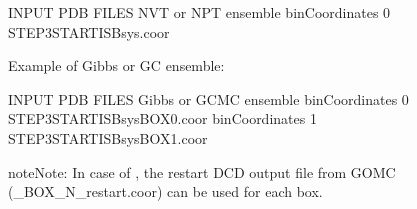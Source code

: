 \documentclass[letterpaper,10pt,english]{sphinxmanual}
\begin{document}
\begin{description}
\begin{sphinxVerbatim}[commandchars=\\\{\}]
\PYGZsh{}\PYGZsh{}\PYGZsh{}\PYGZsh{}\PYGZsh{}\PYGZsh{}\PYGZsh{}\PYGZsh{}\PYGZsh{}\PYGZsh{}\PYGZsh{}\PYGZsh{}\PYGZsh{}\PYGZsh{}\PYGZsh{}\PYGZsh{}\PYGZsh{}\PYGZsh{}\PYGZsh{}\PYGZsh{}\PYGZsh{}\PYGZsh{}\PYGZsh{}\PYGZsh{}\PYGZsh{}\PYGZsh{}\PYGZsh{}\PYGZsh{}\PYGZsh{}\PYGZsh{}\PYGZsh{}\PYGZsh{}\PYGZsh{}\PYGZsh{}\PYGZsh{}\PYGZsh{}\PYGZsh{}\PYGZsh{}\PYGZsh{}\PYGZsh{}\PYGZsh{}\PYGZsh{}\PYGZsh{}\PYGZsh{}\PYGZsh{}
\PYGZsh{} INPUT PDB FILES \PYGZhy{} NVT or NPT ensemble
\PYGZsh{}\PYGZsh{}\PYGZsh{}\PYGZsh{}\PYGZsh{}\PYGZsh{}\PYGZsh{}\PYGZsh{}\PYGZsh{}\PYGZsh{}\PYGZsh{}\PYGZsh{}\PYGZsh{}\PYGZsh{}\PYGZsh{}\PYGZsh{}\PYGZsh{}\PYGZsh{}\PYGZsh{}\PYGZsh{}\PYGZsh{}\PYGZsh{}\PYGZsh{}\PYGZsh{}\PYGZsh{}\PYGZsh{}\PYGZsh{}\PYGZsh{}\PYGZsh{}\PYGZsh{}\PYGZsh{}\PYGZsh{}\PYGZsh{}\PYGZsh{}\PYGZsh{}\PYGZsh{}\PYGZsh{}\PYGZsh{}\PYGZsh{}\PYGZsh{}\PYGZsh{}\PYGZsh{}\PYGZsh{}\PYGZsh{}\PYGZsh{}
binCoordinates   0   STEP3\PYGZus{}START\PYGZus{}ISB\PYGZus{}sys.coor
\end{sphinxVerbatim}

\sphinxAtStartPar
Example of Gibbs or GC ensemble:

\begin{sphinxVerbatim}[commandchars=\\\{\}]
\PYGZsh{}\PYGZsh{}\PYGZsh{}\PYGZsh{}\PYGZsh{}\PYGZsh{}\PYGZsh{}\PYGZsh{}\PYGZsh{}\PYGZsh{}\PYGZsh{}\PYGZsh{}\PYGZsh{}\PYGZsh{}\PYGZsh{}\PYGZsh{}\PYGZsh{}\PYGZsh{}\PYGZsh{}\PYGZsh{}\PYGZsh{}\PYGZsh{}\PYGZsh{}\PYGZsh{}\PYGZsh{}\PYGZsh{}\PYGZsh{}\PYGZsh{}\PYGZsh{}\PYGZsh{}\PYGZsh{}\PYGZsh{}\PYGZsh{}\PYGZsh{}\PYGZsh{}\PYGZsh{}\PYGZsh{}\PYGZsh{}\PYGZsh{}\PYGZsh{}\PYGZsh{}\PYGZsh{}\PYGZsh{}\PYGZsh{}\PYGZsh{}
\PYGZsh{} INPUT PDB FILES \PYGZhy{} Gibbs or GCMC ensemble
\PYGZsh{}\PYGZsh{}\PYGZsh{}\PYGZsh{}\PYGZsh{}\PYGZsh{}\PYGZsh{}\PYGZsh{}\PYGZsh{}\PYGZsh{}\PYGZsh{}\PYGZsh{}\PYGZsh{}\PYGZsh{}\PYGZsh{}\PYGZsh{}\PYGZsh{}\PYGZsh{}\PYGZsh{}\PYGZsh{}\PYGZsh{}\PYGZsh{}\PYGZsh{}\PYGZsh{}\PYGZsh{}\PYGZsh{}\PYGZsh{}\PYGZsh{}\PYGZsh{}\PYGZsh{}\PYGZsh{}\PYGZsh{}\PYGZsh{}\PYGZsh{}\PYGZsh{}\PYGZsh{}\PYGZsh{}\PYGZsh{}\PYGZsh{}\PYGZsh{}\PYGZsh{}\PYGZsh{}\PYGZsh{}\PYGZsh{}\PYGZsh{}
binCoordinates   0   STEP3\PYGZus{}START\PYGZus{}ISB\PYGZus{}sys\PYGZus{}BOX\PYGZus{}0.coor
binCoordinates   1   STEP3\PYGZus{}START\PYGZus{}ISB\PYGZus{}sys\PYGZus{}BOX\PYGZus{}1.coor
\end{sphinxVerbatim}

\begin{sphinxadmonition}{note}{Note:}
\sphinxAtStartPar
In case of , the restart DCD output file from GOMC (\_BOX\_N\_restart.coor) can be used for each box.
\end{sphinxadmonition}


\end{description}
\end{document}
